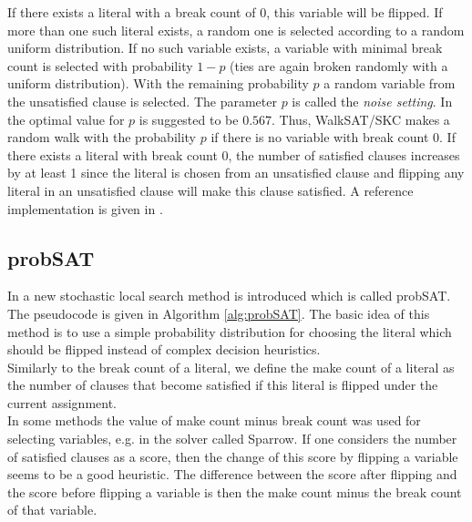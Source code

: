 \documentclass[12pt,a4paper]{article}
\begin{document}
If there exists a literal with a break count of 0, this variable will be flipped. If more than one such literal exists, a random one is selected according to a random uniform distribution. If no such variable exists, a variable with minimal break count is selected with probability $1-p$ (ties are again broken randomly with a uniform distribution). With the remaining probability $p$ a random variable from the unsatisfied clause is selected.  The parameter $p$ is called the \textit{noise setting}. In \cite{kroc} the optimal value for $p$ is suggested to be $0.567$. Thus, WalkSAT/SKC makes a random walk with the probability $p$ if there is no variable with break count 0. If there exists a literal with break count 0, the number of satisfied clauses increases by at least 1 since the literal is chosen from an unsatisfied clause and flipping any literal in an unsatisfied clause will make this clause satisfied. A reference implementation is given in \cite{kautz}.

\subsection{probSAT} \label{s:probSAT}
In \cite{probSAT} a new stochastic local search method is introduced which is called probSAT. The pseudocode is given in Algorithm \ref{alg:probSAT}. The basic idea of this method is to use a simple probability distribution for choosing the literal which should be flipped instead of complex decision heuristics.\\
Similarly to the break count of a literal, we define the make count of a literal as the number of clauses that become satisfied if this literal is flipped under the current assignment.\\ 
In some methods the value of make count minus break count was used for selecting variables, e.g. in the solver called Sparrow. If one considers the number of satisfied clauses as a score, then the change of this score by flipping a variable seems to be a good heuristic. The difference between the score after flipping and the score before flipping a variable is then the make count minus the break count of that variable.\\
\end{document}
